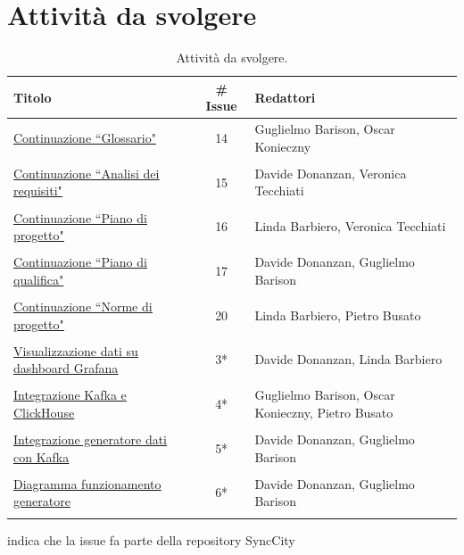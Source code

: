 \documentclass[8pt]{article}
\begin{document}
\section{Attività da svolgere}
\begin{table}[ht!]
	\centering
	\begin{tabular}{p{7cm}cp{7cm}}
		\toprule
		\textbf{Titolo} & \textbf{\# Issue} & \textbf{Redattori} \\
		\midrule
		\href{https://github.com/NaN1fy/docs/issues/14}{\underline{Continuazione ``Glossario"}} & 14 & Guglielmo Barison, Oscar Konieczny\\\\
		\href{https://github.com/NaN1fy/docs/issues/15}{\underline{Continuazione ``Analisi dei requisiti"}} & 15 & Davide Donanzan, Veronica Tecchiati\\\\
		\href{https://github.com/NaN1fy/docs/issues/16}{\underline{Continuazione ``Piano di progetto"}} & 16 & Linda Barbiero, Veronica Tecchiati\\\\
		\href{https://github.com/NaN1fy/docs/issues/17}{\underline{Continuazione ``Piano di qualifica"}} & 17 & Davide Donanzan, Guglielmo Barison\\\\
		\href{https://github.com/NaN1fy/docs/issues/20}{\underline{Continuazione ``Norme di progetto"}} & 20 & Linda Barbiero, Pietro Busato\\\\
		\href{https://github.com/NaN1fy/SyncCity/issues/3}{\underline{Visualizzazione dati su dashboard Grafana}} & 3*\tnote{*} & Davide Donanzan, Linda Barbiero\\\\
		\href{https://github.com/NaN1fy/SyncCity/issues/4}{\underline{Integrazione Kafka e ClickHouse}} & 4*\tnote{*} & Guglielmo Barison, Oscar Konieczny, Pietro Busato\\\\
		\href{https://github.com/NaN1fy/SyncCity/issues/5}{\underline{Integrazione generatore dati con Kafka}} & 5*\tnote{*} & Davide Donanzan, Guglielmo Barison\\\\
		\href{https://github.com/NaN1fy/SyncCity/issues/6}{\underline{Diagramma funzionamento generatore}} & 6*\tnote{*} & Davide Donanzan, Guglielmo Barison\\\\
		\bottomrule
	\end{tabular}
	\begin{tablenotes}
		\vspace{1em}
		\item * indica che la issue fa parte della repository SyncCity
	\end{tablenotes}
	\caption{Attività da svolgere.}
	\label{table:Attivita da svolgere}
\end{table}
\end{document}
